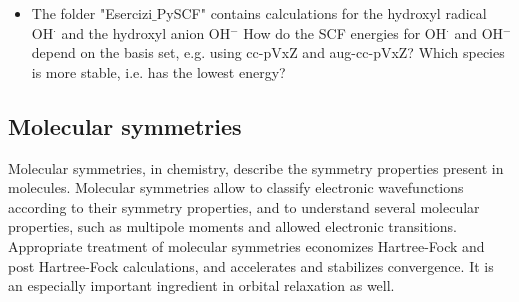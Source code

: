 \documentclass{article}
\begin{document}
\begin{itemize}
\item The folder "Esercizi$\_$PySCF" contains calculations for the hydroxyl radical OH$^\cdot$ and the hydroxyl anion OH$^{-}$
How do the SCF energies for OH$^\cdot$ and OH$^{-}$ depend on the basis set, e.g. using cc-pVxZ and aug-cc-pVxZ?
Which species is more stable, i.e. has the lowest energy?
\end{itemize}

\pagebreak
\newpage

\subsection{Molecular symmetries}

Molecular symmetries, in chemistry, describe the symmetry properties present in molecules. Molecular symmetries allow to classify electronic wavefunctions according to their symmetry properties,
and to understand several molecular properties, such as multipole moments and allowed electronic transitions. Appropriate treatment of molecular symmetries economizes Hartree-Fock and post Hartree-Fock calculations,
and accelerates and stabilizes convergence. It is an especially important ingredient in orbital relaxation as well.
\end{document}
